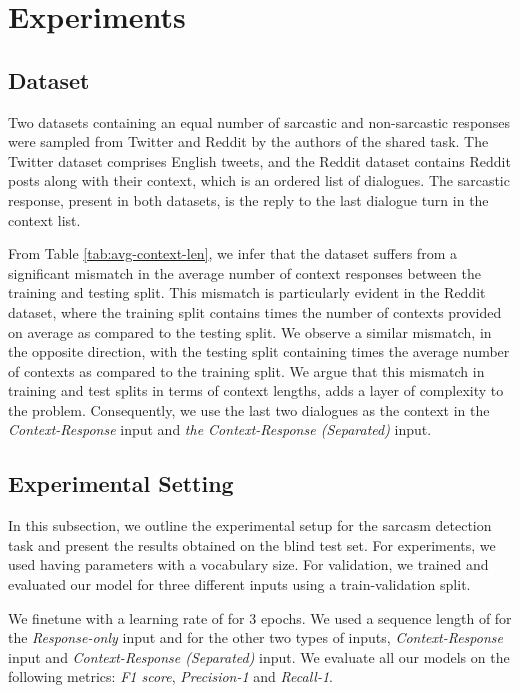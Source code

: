 \documentclass[11pt,a4paper]{article}
\begin{document}
\section{Experiments}

\subsection{Dataset}

Two datasets containing an equal number of sarcastic and non-sarcastic responses were sampled from Twitter and Reddit by the authors of the shared task. The Twitter dataset comprises  English tweets, and the Reddit dataset contains  Reddit posts along with their context, which is an ordered list of dialogues. The sarcastic response, present in both datasets, is the reply to the last dialogue turn in the context list.

From Table \ref{tab:avg-context-len}, we infer that the dataset suffers from a significant mismatch in the average number of context responses between the training and testing split. This mismatch is particularly evident in the Reddit dataset, where the training split contains  times the number of contexts provided on average as compared to the testing split. We observe a similar mismatch, in the opposite direction, with the testing split containing  times the average number of contexts as compared to the training split. We argue that this mismatch in training and test splits in terms of context lengths, adds a layer of complexity to the problem. Consequently, we use the last two dialogues as the context in the \textit{Context-Response} input and \textit{the Context-Response (Separated)} input.


\subsection{Experimental Setting}
In this subsection, we outline the experimental setup for the sarcasm detection task and present the results obtained on the blind test set. For experiments, we used  having  parameters with a  vocabulary size. For validation, we trained and evaluated our model for three different inputs using a  train-validation split.

We finetune  with a learning rate of  for 3 epochs. We used a sequence length of  for the \textit{Response-only} input and  for the other two types of inputs, \textit{Context-Response} input and \textit{Context-Response (Separated)} input. We evaluate all our models on the following metrics: \textit{F1 score}, \textit{Precision-1} and \textit{Recall-1}.
\end{document}
